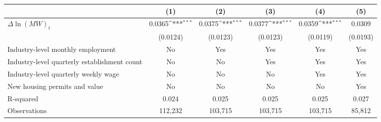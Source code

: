 {
\def\sym#1{\ifmmode^{#1}\else\(^{#1}\)\fi}
\begin{tabular}{l*{5}{c}}
\hline\hline
          &\multicolumn{1}{c}{(1)}         &\multicolumn{1}{c}{(2)}         &\multicolumn{1}{c}{(3)}         &\multicolumn{1}{c}{(4)}         &\multicolumn{1}{c}{(5)}         \\
\hline
$\Delta \ln(MW)_{t}$&   0.0365\sym{***}&   0.0375\sym{***}&   0.0377\sym{***}&   0.0359\sym{***}&   0.0309         \\
          & (0.0124)         & (0.0123)         & (0.0123)         & (0.0119)         & (0.0193)         \\
\hline
Industry-level monthly employment&       No         &      Yes         &      Yes         &      Yes         &      Yes         \\
Industry-level quarterly establishment count&       No         &       No         &      Yes         &      Yes         &      Yes         \\
Industry-level quarterly weekly wage&       No         &       No         &       No         &      Yes         &      Yes         \\
New housing permits and value&       No         &       No         &       No         &       No         &      Yes         \\
R-squared &    0.024         &    0.025         &    0.025         &    0.025         &    0.027         \\
Observations&  112,232         &  103,715         &  103,715         &  103,715         &   85,812         \\
\hline\hline
\end{tabular}
}
